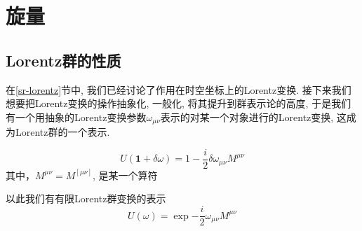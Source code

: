 \section{旋量}
\subsection{Lorentz群的性质\label{Lorentz}}
在\ref{sr-lorentz}节中, 我们已经讨论了作用在时空坐标上的Lorentz变换. 接下来我们想要把Lorentz变换的操作抽象化, 一般化, 将其提升到群表示论的高度, 于是我们有一个用抽象的Lorentz变换参数$\omega_{\mu\nu}$表示的对某一个对象进行的Lorentz变换, 这成为Lorentz群的一个表示.
\begin{definition}
    \begin{equation}
        U(\mathbf 1+\delta\omega)=1-\frac i2\delta\omega_{\mu\nu}M^{\mu\nu}
    \end{equation}
    其中，$M^{\mu\nu}=M^{[\mu\nu]}$, 是某一个算符
\end{definition}
以此我们有有限Lorentz群变换的表示
\begin{equation}
    U(\omega)=\exp{-\frac i2\omega_{\mu\nu}M^{\mu\nu}}
\end{equation}

